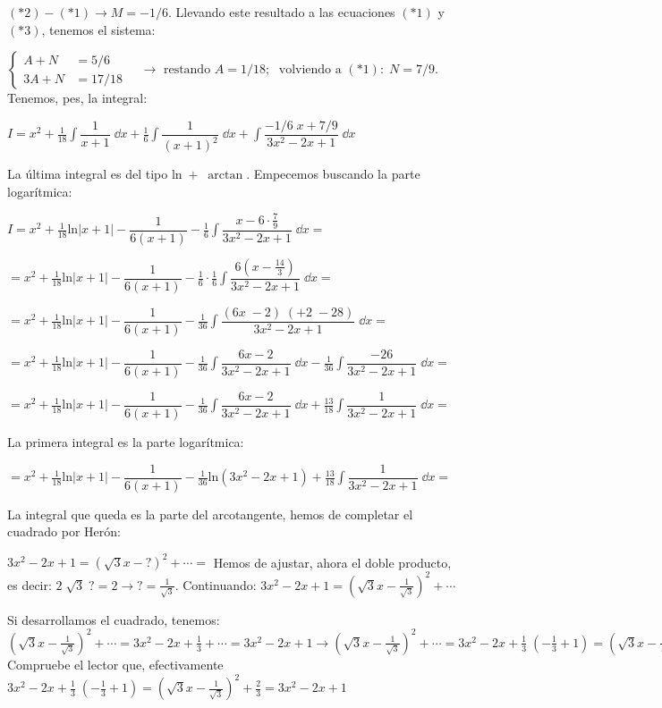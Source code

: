 {\begin{proofw}
$(*2)-(*1) \to M=-1/6$. Llevando este resultado a las ecuaciones $(*1)$ y $(*3)$, tenemos el sistema: 

$\begin{cases}
A+N & = 5/6 \\
3A + N & = 17/18	
\end{cases} \quad \to \text { restando } A=1/18; \; \text{ volviendo a } (*1):\; N=7/9$. Tenemos, pes, la integral:

$I= \displaystyle x^2 + \frac {1}{18} \int \dfrac {1}{x+1} \; \dd x+ \frac {1}{6} \int \dfrac {1}{(x+1)^2} \; \dd x + \int \dfrac {-1/6\; x + 7/9}{3x^2-2x+1} \; \dd x$

La última integral es del tipo $\mathrm{ln \; +\; \arctan}$. Empecemos buscando la parte logarítmica:

$I=\displaystyle x^2 + \frac {1}{18} \mathrm{ln}|x+1| - \dfrac {1}{6(x+1)}- \frac 1 6 \int \dfrac {x-6\cdot \frac 7 9}{3x^2-2x+1} \; \dd x =$

$\displaystyle = x^2 + \frac {1}{18} \mathrm{ln}|x+1| - \dfrac {1}{6(x+1)}- \frac 1 6 \cdot \frac 1 6 \int \dfrac {6(x- \frac {14}{3})}{3x^2-2x+1} \; \dd x =$


$\displaystyle =x^2 + \frac {1}{18} \mathrm{ln}|x+1| - \dfrac {1}{6(x+1)}- \frac {1} {36}  \int \dfrac { (6x\; -2) \; (+2\; - 28)}{3x^2-2x+1} \; \dd x =$

$\displaystyle =x^2 + \frac {1}{18} \mathrm{ln}|x+1| - \dfrac {1}{6(x+1)}- \frac {1} {36}  \int \dfrac { 6x -2}{3x^2-2x+1} \; \dd x
 - \frac {1} {36}  \int \dfrac {-26 }{3x^2-2x+1} \; \dd x=$
 
 
$\displaystyle =x^2 + \frac {1}{18} \mathrm{ln}|x+1| - \dfrac {1}{6(x+1)}- \frac {1} {36}  \int \dfrac { 6x -2}{3x^2-2x+1} \; \dd x+\frac {13} {18}  \int \dfrac {1 }{3x^2-2x+1} \; \dd x=$
 
 La primera integral es la parte logarítmica:
 
 
 $=x^2 + \frac {1}{18} \mathrm{ln}|x+1| - \dfrac {1}{6(x+1)}- \frac {1} {36}  \mathrm{ln} (3x^2-2x+1)
 +\frac {13} {18}  \int \dfrac {1 }{3x^2-2x+1} \; \dd x=$
 
 La integral que queda es la parte del arcotangente, hemos de completar el cuadrado por Herón:
 
 $3x^2-2x+1= (\sqrt{3}x - \boxed {?})^2 +\cdots = $ Hemos de ajustar, ahora el doble producto, es decir: $2 \; \sqrt{3}\; \boxed {?}=2 \to \boxed {?}=	\frac {1}{\sqrt{3}}$. Continuando: $3x^2-2x+1= (\sqrt{3}x -\frac {1}{\sqrt{3}} )^2 +\cdots $
 
 Si desarrollamos el cuadrado, tenemos:$ (\sqrt{3}x -\frac {1}{\sqrt{3}} )^2 +\cdots = 3x^2 -2x + \frac 1 3 +\cdots = 3x^2-2x+1 \to (\sqrt{3}x -\frac {1}{\sqrt{3}} )^2 +\cdots = 3x^2 -2x + \frac 1 3 \; (- \frac 1 3 + 1) =(\sqrt{3}x -\frac {1}{\sqrt{3}} )^2 + \frac 2 3$ \textcolor{gris}{Compruebe el lector que, efectivamente $3x^2 -2x + \frac 1 3 \; (- \frac 1 3 + 1) =(\sqrt{3}x -\frac {1}{\sqrt{3}} )^2 + \frac 2 3=3x^2-2x+1$}
 

\end{proofw}}

